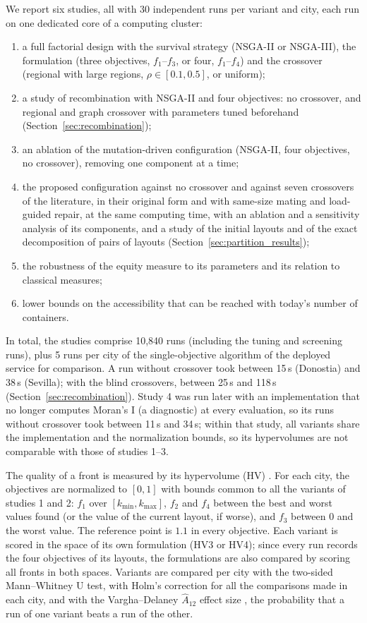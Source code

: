We report six studies, all with 30 independent runs per variant and city, each run on one dedicated core of a computing cluster:
\begin{enumerate}
\item a full factorial design with the survival strategy (NSGA-II or NSGA-III), the formulation (three objectives, $f_1$--$f_3$, or four, $f_1$--$f_4$) and the crossover (regional with large regions, $\rho \in [0.1, 0.5]$, or uniform);
\item a study of recombination with NSGA-II and four objectives: no crossover, and regional and graph crossover with parameters tuned beforehand (Section~\ref{sec:recombination});
\item an ablation of the mutation-driven configuration (NSGA-II, four objectives, no crossover), removing one component at a time;
\item the proposed configuration against no crossover and against seven crossovers of the literature, in their original form and with same-size mating and load-guided repair, at the same computing time, with an ablation and a sensitivity analysis of its components, and a study of the initial layouts and of the exact decomposition of pairs of layouts (Section~\ref{sec:partition_results});
\item the robustness of the equity measure to its parameters and its relation to classical measures;
\item lower bounds on the accessibility that can be reached with today's number of containers.
\end{enumerate}
In total, the studies comprise 10,840 runs (including the tuning and screening runs), plus 5 runs per city of the single-objective algorithm of the deployed service for comparison. A run without crossover took between 15\,s (Donostia) and 38\,s (Sevilla); with the blind crossovers, between 25\,s and 118\,s (Section~\ref{sec:recombination}). Study 4 was run later with an implementation that no longer computes Moran's I (a diagnostic) at every evaluation, so its runs without crossover took between 11\,s and 34\,s; within that study, all variants share the implementation and the normalization bounds, so its hypervolumes are not comparable with those of studies 1--3.

The quality of a front is measured by its hypervolume (HV) \cite{zitzler1999multiobjective}. For each city, the objectives are normalized to $[0,1]$ with bounds common to all the variants of studies 1 and 2: $f_1$ over $[k_{\min}, k_{\max}]$, $f_2$ and $f_4$ between the best and worst values found (or the value of the current layout, if worse), and $f_3$ between 0 and the worst value. The reference point is $1.1$ in every objective. Each variant is scored in the space of its own formulation (HV3 or HV4); since every run records the four objectives of its layouts, the formulations are also compared by scoring all fronts in both spaces. Variants are compared per city with the two-sided Mann--Whitney U test, with Holm's correction for all the comparisons made in each city, and with the Vargha--Delaney $\hat{A}_{12}$ effect size \cite{vargha2000critique}, the probability that a run of one variant beats a run of the other.

